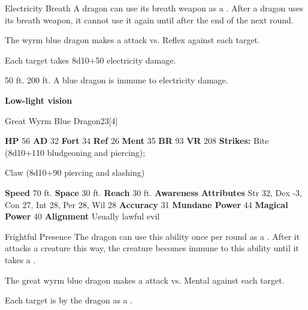     \begin{freeability}{Electricity Breath}
      A dragon can use its breath weapon as a .
      After a dragon uses its breath weapon, it cannot use it again until after the end of the next round.
      \par The wyrm blue dragon makes a  attack
        vs. Reflex against each target.
    
    \hit Each target takes 8d10+50 electricity damage.
    \end{freeability}
  
      
       50 ft.
     200 ft.
     A blue dragon is immune to electricity damage.
    \par\noindent\textbf{Low-light vision}
  

  \begin{monsubsection}{Great Wyrm Blue Dragon}{23}[4]
    \vspace{-1em}\vspace{-1em}
    \vspace{0em}

    
    

    \begin{spellcontent}
      \begin{spelltargetinginfo}
        \pari \textbf{HP} 56 \monsep
          \textbf{AD} 32 \monsep
          \textbf{Fort} 34 \monsep
          \textbf{Ref} 26 \monsep
          \textbf{Ment} 35
        \pari \textbf{BR} 93 \monsep
        \textbf{VR} 208
        \pari \textbf{Strikes:}
            Bite  (8d10+110 bludgeoning and piercing);
\par Claw  (8d10+90 piercing and slashing)
      \end{spelltargetinginfo}
    \end{spellcontent}
    \begin{monsterfooter}
      \pari \textbf{Speed} 70 ft. \monsep
        \textbf{Space} 30 ft. \monsep
        \textbf{Reach} 30 ft.
      \pari \textbf{Awareness} 
      \pari \textbf{Attributes}
        Str 32, Dex -3,
        Con 27, Int 28,
        Per 28, Wil 28
      \pari \textbf{Accuracy} 31 \monsep
        \textbf{Mundane Power} 44 \monsep
      \textbf{Magical Power} 40
      \pari \textbf{Alignment} Usually lawful evil
    \end{monsterfooter}
  \end{monsubsection}
  \begin{freeability}{Frightful Presence}
      The dragon can use this ability once per round as a .
      After it attacks a creature this way, the creature becomes immune to this ability until it takes a .
      \par The great wyrm blue dragon makes a  attack
        vs. Mental against each target.
    
    \hit Each target is  by the dragon as a .
    \end{freeability}
  

